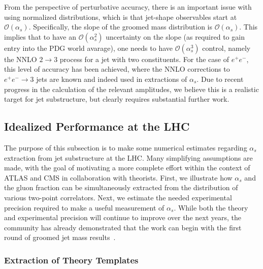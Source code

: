 \documentclass[11pt]{cernrep}
\begin{document}
From the perspective of perturbative accuracy, there is an important issue with using normalized distributions, which is that jet-shape observables start at $\mathcal{O}(\alpha_s)$.
%
Specifically, the slope of the groomed mass distribution is $\mathcal{O}(\alpha_s)$.
%
This implies that to have an $\mathcal{O}(\alpha_s^2)$ uncertainty on the slope (as required to gain entry into the PDG world avarage), one needs to have $\mathcal{O}(\alpha_s^3)$ control, namely the NNLO $2 \to 3$ process for a jet with two constituents.
%
For the case of $e^+e^-$, this level of accuracy has been achieved, where the NNLO corrections to $e^+e^-\to 3$ jets are known and indeed used in extractions of $\alpha_s$.
%
Due to recent progress in the calculation of the relevant amplitudes, we believe this is a realistic target for jet substructure, but clearly requires substantial further work.

\subsection{Idealized Performance at the LHC}
\label{jetsub_alphas_sec:ben_study}

The purpose of this subsection is to make some numerical estimates regarding $\alpha_s$ extraction from jet substructure at the LHC.
%
Many simplifying assumptions are made, with the goal of motivating a more complete effort within the context of ATLAS and CMS in collaboration with theorists.
%
First, we illustrate how $\alpha_s$ and the gluon fraction can be simultaneously extracted from the distribution of various two-point correlators.
%
Next, we estimate the needed experimental precision required to make a useful measurement of $\alpha_s$.
%
While both the theory and experimental precision will continue to improve over the next years, the community has already demonstrated that the work can begin with the first round of groomed jet mass results~\cite{Frye:2016okc,Frye:2016aiz,Marzani:2017mva,Marzani:2017kqd,Aaboud:2017qwh,CMS-PAS-SMP-16-010}.

\subsubsection{Extraction of Theory Templates}
\label{jetsub_alphas_sec:templates}
\end{document}
